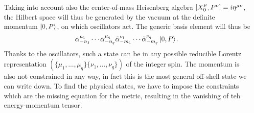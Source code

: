 Taking into account also the center-of-mass Heisenberg algebra $[X_0^\mu,P^\nu] = i\eta^{\mu\nu}$, the Hilbert space will thus be generated by the vacuum at the definite momentum $\ket{0,P}$, on which oscillators act. The generic basis element will thus be 
\begin{equation}
    \alpha^{\mu_1}_{-n_1}\cdots\alpha^{\mu_q}_{-n_q}\tilde{\alpha}^{\nu_1}_{-m_1}\cdots\tilde{\alpha}^{\nu_q}_{-m_q}\ket{0,P}.
\end{equation}
Thanks to the oscillators, such a state can be in any possible reducible Lorentz representation $(\{\mu_1,{\dots},\mu_q\}\{\nu_1,{\dots},\nu_q\})$ of the integer spin. The momentum is also not constrained in any way, in fact this is the most general off-shell state we can write down. To find the physical states, we have to impose the constraints which are the missing equation for the metric, resulting in the vanishing of teh energy-momentum tensor. 

